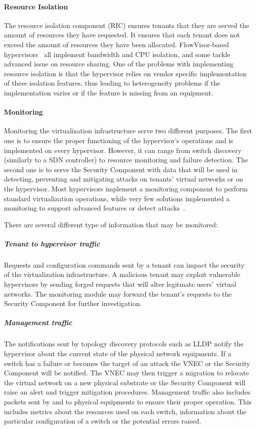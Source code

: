 \paragraph{Resource Isolation}
The resource isolation component (RIC) ensures tenants that they are served the amount of resources they have requested.
It ensures that each tenant does not exceed the amount of resources they have been allocated.
FlowVisor-based hypervisors~\cite{FlowVisor-Sherwood2009,ADVisor-Salvadori2012,VeRTIGO-Corin2012a,EnhancedFV-Min2012,SlicesIsolator-El-Azzab2011,DoubleFV-Yin2013} all implement bandwidth and CPU isolation, and some tackle advanced issue on resource sharing. One of the problems with implementing resource isolation is that the hypervisor relies on vendor specific implementation of these isolation features, thus leading to heterogeneity problems if the implementation varies or if the feature is missing from an equipment.


\paragraph{Monitoring}
Monitoring the virtualization infrastructure serve two different purposes.
The first one is to ensure the proper functioning of the hypervisor's operations and is implemented on every hypervisor. However, it can range from switch discovery (similarly to a SDN controller) to resource monitoring and failure detection.
The second one is to serve the Security Component with data that will be used in detecting, preventing and mitigating attacks on tenants' virtual networks or on the hypervisor.
Most hypervisors implement a monitoring component to perform standard virtualization operations, while very few solutions implemented a monitoring to support advanced features or detect attacks~\cite{VeRTIGO-Corin2012a,CoVisor-Jin2015,FlowN-Drutskoy2012,AutoSlice-Bozakov2012,NVP-Koponen2014,ONVisor-Han2018}.

There are several different type of information that may be monitored:

\subparagraph{Tenant to hypervisor traffic} Requests and configuration commands sent by a tenant can impact the security of the virtualization infrastructure. A malicious tenant may exploit vulnerable hypervisors by sending forged requests that will alter legitmate users' virtual networks. The monitoring module may forward the tenant's requests to the Security Component for further investigation.

\subparagraph{Management traffic} 
The notifications sent by topology discovery protocols such as LLDP notify the hypervisor about the current state of the physical network equipments. If a switch has a failure or becomes the target of an attack the VNEC or the Security Component will be notified. The VNEC may then trigger a migration to relocate the virtual network on a new physical substrate or the Security Component will raise an alert and trigger mitigation procedures.
Management traffic also includes packets sent by and to physical equipments to ensure their proper operation.
This includes metrics about the resources used on each switch, information about the particular configuration of a switch or the potential errors raised.

